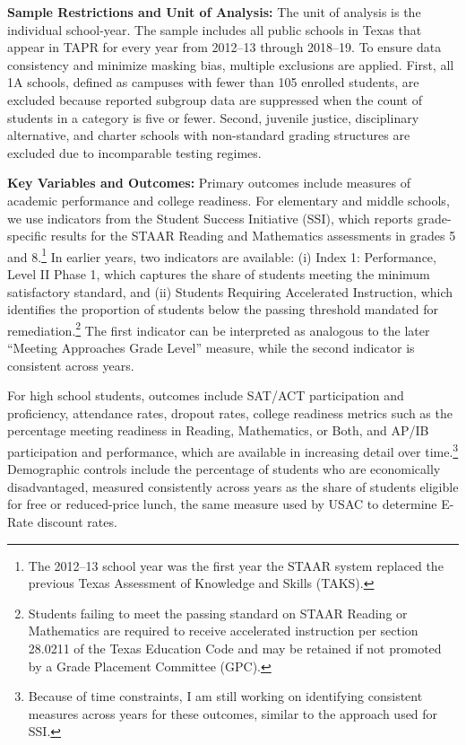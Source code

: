 \textbf{Sample Restrictions and Unit of Analysis:} The unit of analysis is the individual school-year. The sample includes all public schools in Texas that appear in TAPR for every year from 2012--13 through 2018--19. To ensure data consistency and minimize masking bias, multiple exclusions are applied. First, all 1A schools, defined as campuses with fewer than 105 enrolled students, are excluded because reported subgroup data are suppressed when the count of students in a category is five or fewer. Second, juvenile justice, disciplinary alternative, and charter schools with non-standard grading structures are excluded due to incomparable testing regimes.

\textbf{Key Variables and Outcomes:} Primary outcomes include measures of academic performance and college readiness. For elementary and middle schools, we use indicators from the Student Success Initiative (SSI), which reports grade-specific results for the STAAR Reading and Mathematics assessments in grades 5 and 8.\footnote{The 2012--13 school year was the first year the STAAR system replaced the previous Texas Assessment of Knowledge and Skills (TAKS).} In earlier years, two indicators are available: (i) Index 1: Performance, Level II Phase 1, which captures the share of students meeting the minimum satisfactory standard, and (ii) Students Requiring Accelerated Instruction, which identifies the proportion of students below the passing threshold mandated for remediation.\footnote{Students failing to meet the passing standard on STAAR Reading or Mathematics are required to receive accelerated instruction per section 28.0211 of the Texas Education Code and may be retained if not promoted by a Grade Placement Committee (GPC).} The first indicator can be interpreted as analogous to the later “Meeting Approaches Grade Level” measure, while the second indicator is consistent across years.

For high school students, outcomes include SAT/ACT participation and proficiency, attendance rates, dropout rates, college readiness metrics such as the percentage meeting readiness in Reading, Mathematics, or Both, and AP/IB participation and performance, which are available in increasing detail over time.\footnote{Because of time constraints, I am still working on identifying consistent measures across years for these outcomes, similar to the approach used for SSI.} Demographic controls include the percentage of students who are economically disadvantaged, measured consistently across years as the share of students eligible for free or reduced-price lunch, the same measure used by USAC to determine E-Rate discount rates.

